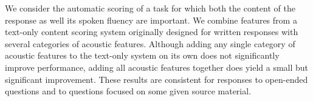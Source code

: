 We consider the automatic scoring of a task for which both the content of the response as well its spoken fluency are important. We combine features from a text-only content scoring system originally designed for written responses with several categories of acoustic features. Although adding any single category of acoustic features to the text-only system on its own does not significantly improve performance, adding all acoustic features together does yield a small but significant improvement. These results are consistent for responses to open-ended questions and to questions focused on some given source material.
